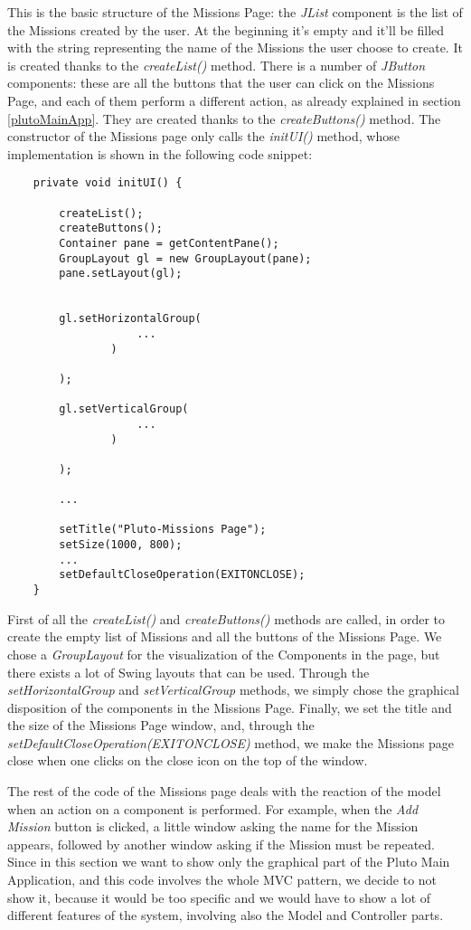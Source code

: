 This is the basic structure of the Missions Page:
the \textit{JList} component is the list of the Missions created by the user. At the beginning it's empty and it'll be filled with the string representing the name of the Missions the user choose to create.
It is created thanks to the \textit{createList()} method.
There is a number of \textit{JButton} components:
these are all the buttons that the user can click on the Missions Page, and each of them perform a different action, as already explained in section \ref{plutoMainApp}.
They are created thanks to the \textit{createButtons()} method.
The constructor of the Missions page only calls the \textit{initUI()} method, whose implementation is shown in the following code snippet:

\begin{lstlisting}
	private void initUI() {

		createList();
		createButtons();
		Container pane = getContentPane();
		GroupLayout gl = new GroupLayout(pane);
		pane.setLayout(gl);


		gl.setHorizontalGroup(
        			...
				)
                
        );

		gl.setVerticalGroup(
					...
				)

		);

		...

		setTitle("Pluto-Missions Page");
		setSize(1000, 800);
        ...
		setDefaultCloseOperation(EXITONCLOSE);
	}
\end{lstlisting}

First of all the \textit{createList()} and \textit{createButtons()} methods are called, in order to create the empty list of Missions and all the buttons of the Missions Page.
We chose a \textit{GroupLayout} for the visualization of the Components in the page, but there exists a lot of Swing layouts that can be used.
Through the \textit{setHorizontalGroup} and \textit{setVerticalGroup} methods, we simply chose the graphical disposition of the components in the Missions Page.
Finally, we set the title and the size of the Missions Page window, and, through the \textit{setDefaultCloseOperation(EXITONCLOSE)} method, we make the Missions page close when one clicks on the close icon on the top of the window.

The rest of the code of the Missions page deals with the reaction of the model when an action on a component is performed.
For example, when the \textit{Add Mission} button is clicked, a little window asking the name for the Mission appears, followed by another window asking if the Mission must be repeated.
Since in this section we want to show only the graphical part of the Pluto Main Application, and this code involves the whole MVC pattern, we decide to not show it, because it would be too specific and we would have to show a lot of different features of the system, involving also the Model and Controller parts.
\\

